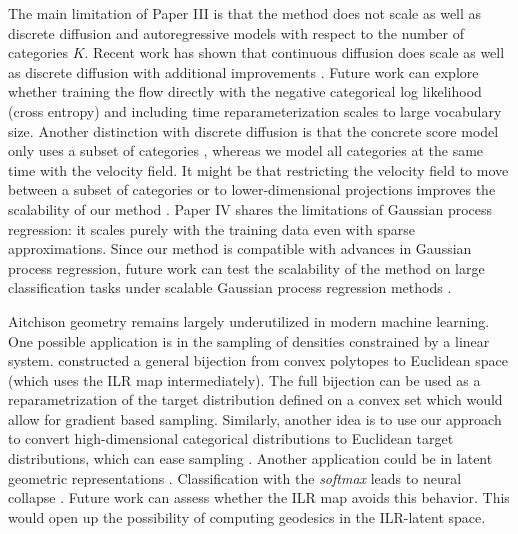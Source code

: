 The main limitation of Paper III is that the method does not scale as well as discrete diffusion and autoregressive  models with respect to the number of categories $K$. Recent work has shown that continuous diffusion does scale as well as discrete diffusion with additional improvements \citep{lee2026flow,potaptchik2026discrete,roos2026categorical}. Future work can explore whether training the flow directly with the negative categorical log likelihood (cross entropy) and including time reparameterization scales to large vocabulary size. Another distinction with discrete diffusion is that the concrete score model only uses a subset of categories \citep{Lou2024}, whereas we model all categories at the same time with the velocity field. It might be that restricting the velocity field to move between a subset of categories or to lower-dimensional projections improves the scalability of our method \citep{chen2026langflow}.
Paper IV shares the limitations of Gaussian process regression: it scales purely with the training data even with sparse approximations. Since our method is compatible with advances in Gaussian process regression, future work can test the scalability of the method on large classification tasks under scalable Gaussian process regression methods \citep{maronas2023efficient}.

Aitchison geometry remains largely underutilized in modern machine learning. One possible application is in the sampling of densities constrained by a linear system. \citet{Diederen2025} constructed a general bijection from convex polytopes to Euclidean space (which uses the ILR map intermediately). The full bijection can be used as a reparametrization of the target distribution defined on a convex set which would allow for gradient based sampling. Similarly, another idea is to use our approach to convert high-dimensional categorical distributions to Euclidean target distributions, which can ease sampling \citep{mohanty2026slithering}. 
Another application could be in latent geometric representations \citep{yu2025connecting}. Classification with the \emph{softmax} leads to neural collapse \citep{kothapalli2023neural}. Future work can assess whether the ILR map avoids this behavior. This would open up the possibility of computing geodesics in the ILR-latent space.
